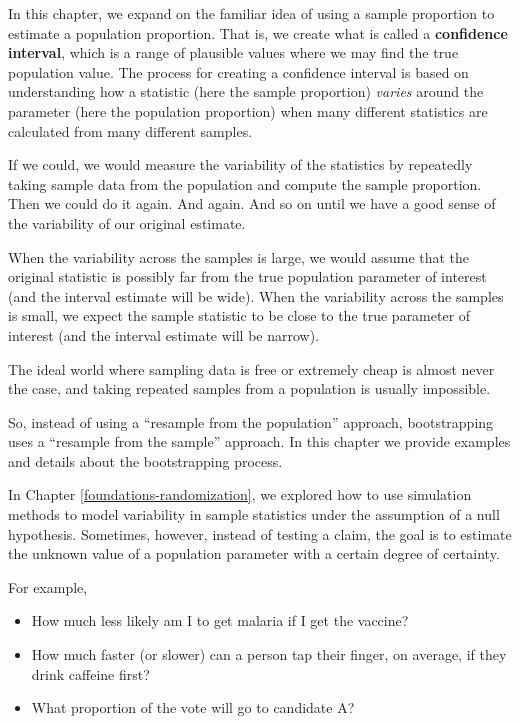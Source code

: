 \documentclass[
  10pt,
  openany]{book}
\providecommand{\tightlist}{%
  \setlength{\itemsep}{0pt}\setlength{\parskip}{0pt}}
\theoremstyle{definition}
\theoremstyle{definition}
\theoremstyle{definition}
\theoremstyle{definition}
\theoremstyle{remark}
\begin{document}
In this chapter, we expand on the familiar idea of using a sample proportion to estimate a population proportion.
That is, we create what is called a \textbf{confidence interval}, which is a range of plausible values where we may find the true population value.
The process for creating a confidence interval is based on understanding how a statistic (here the sample proportion) \emph{varies} around the parameter (here the population proportion) when many different statistics are calculated from many different samples.

If we could, we would measure the variability of the statistics by repeatedly taking sample data from the population and compute the sample proportion.
Then we could do it again.
And again.
And so on until we have a good sense of the variability of our original estimate.

When the variability across the samples is large, we would assume that the original statistic is possibly far from the true population parameter of interest (and the interval estimate will be wide).
When the variability across the samples is small, we expect the sample statistic to be close to the true parameter of interest (and the interval estimate will be narrow).

The ideal world where sampling data is free or extremely cheap is almost never the case, and taking repeated samples from a population is usually impossible.

So, instead of using a ``resample from the population'' approach, bootstrapping uses a ``resample from the sample'' approach.
In this chapter we provide examples and details about the bootstrapping process.

In Chapter \ref{foundations-randomization}, we explored how to use simulation methods
to model variability in sample statistics under the assumption of a null hypothesis.
Sometimes, however, instead of testing a claim, the goal is to estimate the unknown
value of a population parameter with a certain degree of certainty.

For example,

\begin{itemize}
\tightlist
\item
  How much less likely am I to get malaria if I get the vaccine?
\item
  How much faster (or slower) can a person tap their finger, on average, if they drink caffeine first?
\item
  What proportion of the vote will go to candidate A?
\end{itemize}
\end{document}
